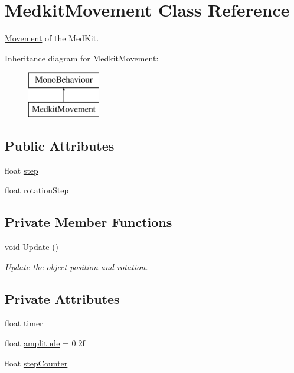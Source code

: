 \hypertarget{class_medkit_movement}{}\section{Medkit\+Movement Class Reference}
\label{class_medkit_movement}


\mbox{\hyperlink{class_movement}{Movement}} of the Med\+Kit.  


Inheritance diagram for Medkit\+Movement\+:\begin{figure}[H]
\begin{center}
\leavevmode
\includegraphics[height=2.000000cm]{class_medkit_movement}
\end{center}
\end{figure}
\subsection*{Public Attributes}
\begin{DoxyCompactItemize}
\item 
float \mbox{\hyperlink{class_medkit_movement_aa9a091704ce4a8e72975c5ea3d7b0df2}{step}}
\item 
float \mbox{\hyperlink{class_medkit_movement_a3bd1b0eac19a16fcd154e4526e3f242a}{rotation\+Step}}
\end{DoxyCompactItemize}
\subsection*{Private Member Functions}
\begin{DoxyCompactItemize}
\item 
void \mbox{\hyperlink{class_medkit_movement_aee87ec8c63ab7518c7c4330a33278257}{Update}} ()
\begin{DoxyCompactList}\small\item\em Update the object position and rotation. \end{DoxyCompactList}\end{DoxyCompactItemize}
\subsection*{Private Attributes}
\begin{DoxyCompactItemize}
\item 
float \mbox{\hyperlink{class_medkit_movement_a780055e963b3abbab73ff15b76d17301}{timer}}
\item 
float \mbox{\hyperlink{class_medkit_movement_ab7b1fda4dcf8bb05a678c2031f55089b}{amplitude}} = 0.\+2f
\item 
float \mbox{\hyperlink{class_medkit_movement_a71a2c2d41c182da83c7e901d7cbff4b7}{step\+Counter}}
\end{DoxyCompactItemize}



